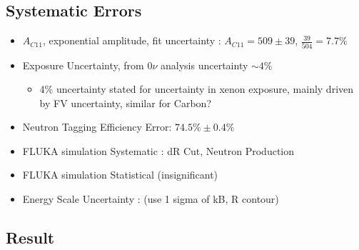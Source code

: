 \documentclass[12pt,letterpaper]{article}
\begin{document}
\subsection*{Systematic Errors}
\begin{itemize}
	\item $A_{C11}$, exponential amplitude, fit uncertainty : $A_{C11}=509\pm39$, $\frac{39}{504}=7.7\%$
	\item Exposure Uncertainty, from $0\nu$ analysis uncertainty $\sim 4\%$
	\begin{itemize}
		\item 4\% uncertainty stated for uncertainty in xenon exposure, mainly driven by FV uncertainty, similar for Carbon?
	\end{itemize}
	\item Neutron Tagging Efficiency Error: $74.5\%\pm0.4\%$
	\item FLUKA simulation Systematic : dR Cut, Neutron Production
	\item FLUKA simulation Statistical (insignificant)
	\item Energy Scale Uncertainty : (use 1 sigma of kB, R contour)
\end{itemize}

\subsection*{Result}
\end{document}
